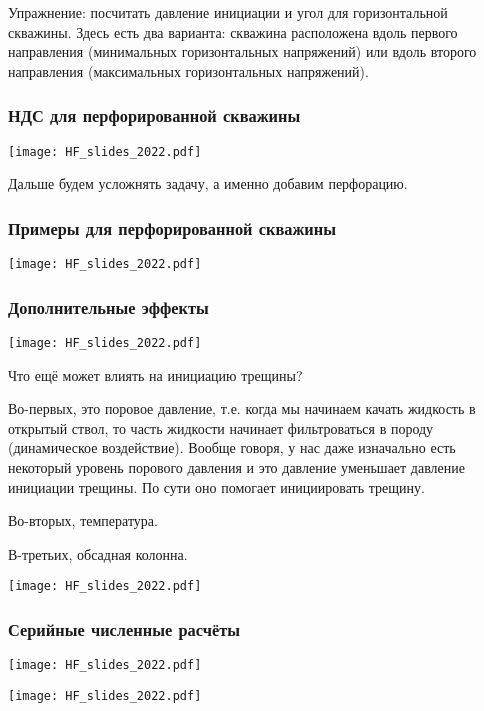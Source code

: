 \documentclass[main.tex]{subfiles}
\begin{document}
Упражнение: посчитать давление инициации и угол для горизонтальной скважины.
Здесь есть два варианта: скважина расположена вдоль первого направления (минимальных горизонтальных напряжений) или вдоль второго направления (максимальных горизонтальных напряжений).

\subsubsection{НДС для перфорированной скважины}

\texttt{[image: HF\_slides\_2022.pdf]}

Дальше будем усложнять задачу, а именно добавим перфорацию.

\subsubsection{Примеры для перфорированной скважины}

\texttt{[image: HF\_slides\_2022.pdf]}

\subsubsection{Дополнительные эффекты}

\texttt{[image: HF\_slides\_2022.pdf]}

Что ещё может влиять на инициацию трещины?

Во-первых, это поровое давление, т.е. когда мы начинаем качать жидкость в открытый ствол, то часть жидкости начинает фильтроваться в породу (динамическое воздействие).
Вообще говоря, у нас даже изначально есть некоторый уровень порового давления и это давление уменьшает давление инициации трещины.
По сути оно помогает инициировать трещину.

Во-вторых, температура.

В-третьих, обсадная колонна.

\texttt{[image: HF\_slides\_2022.pdf]}

\subsubsection{Серийные численные расчёты}

\texttt{[image: HF\_slides\_2022.pdf]}

\texttt{[image: HF\_slides\_2022.pdf]}
\end{document}
